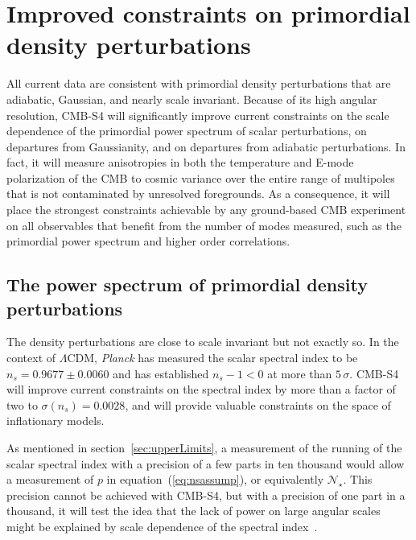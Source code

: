 \section{Improved constraints on primordial density perturbations}
\label{sec:scalar}
All current data are consistent with primordial density perturbations that are adiabatic, Gaussian, and nearly scale invariant. Because of its high angular resolution, CMB-S4 will significantly improve current constraints on the scale dependence of the primordial power spectrum of scalar perturbations, on departures from Gaussianity, and on departures from adiabatic perturbations. In fact, it will measure anisotropies in both the temperature and E-mode polarization of the CMB to cosmic variance over the entire range of multipoles that is not contaminated by unresolved foregrounds. As a consequence, it will place the strongest constraints achievable by any ground-based CMB experiment on all observables that benefit from the number of modes measured, such as the primordial power spectrum and higher order correlations.

\subsection{The power spectrum of primordial density perturbations}
The density perturbations are close to scale invariant but not exactly so. In the context of $\Lambda$CDM, {\it Planck} has measured the scalar spectral index to be $n_s=0.9677\pm0.0060$ and has established $n_s-1<0$ at more than $5\,\sigma$. CMB-S4 will improve current constraints on the spectral index by more than a factor of two to $\sigma(n_s)=0.0028$, and will provide valuable constraints on the space of inflationary models. 

As mentioned in section~\ref{sec:upperLimits}, a measurement of the running of the scalar spectral index with a precision of a few parts in ten thousand would allow a measurement of $p$ in equation~(\ref{eq:nsassump}), or equivalently $\mathcal{N}_\star$. This precision cannot be achieved with CMB-S4, but with a precision of one part in a thousand, it will test the idea that the lack of power on large angular scales might be explained by scale dependence of the spectral index~\cite{Meerburg:2014bpa}.  

